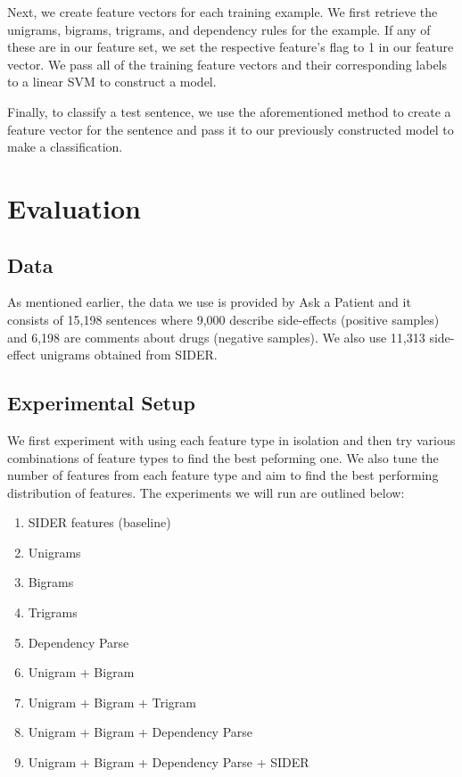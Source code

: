 \documentclass{acm_proc_article-sp}
\begin{document}
Next, we create feature vectors for each training example. We first retrieve the unigrams, bigrams, trigrams, and dependency rules for the example. If any of these are in our feature set, we set the respective feature's flag to 1 in our feature vector. We pass all of the training feature vectors and their corresponding labels to a linear SVM to construct a model.

Finally, to classify a test sentence, we use the aforementioned method to create a feature vector for the sentence and pass it to our previously constructed model to make a classification. 

\section{Evaluation}
\vspace{2mm}
\subsection{Data}
As mentioned earlier, the data we use is provided by Ask a Patient and it consists of 15,198 sentences where 9,000 describe side-effects (positive samples) and 6,198 are comments about drugs (negative samples). We also use 11,313 side-effect unigrams obtained from SIDER.

\subsection{Experimental Setup}
We first experiment with using each feature type in isolation and then try various combinations of feature types to find the best peforming one. We also tune the number of features from each feature type and aim to find the best performing distribution of features. The experiments we will run are outlined below:
\vspace{-3mm}
\begin{enumerate}
\setlength\itemsep{0.2em}
\item SIDER features (baseline)
\item Unigrams
\item Bigrams
\item Trigrams
\item Dependency Parse 
\item Unigram + Bigram
\item Unigram + Bigram + Trigram
\item Unigram + Bigram + Dependency Parse
\item Unigram + Bigram + Dependency Parse + SIDER
\end{enumerate}
\end{document}
